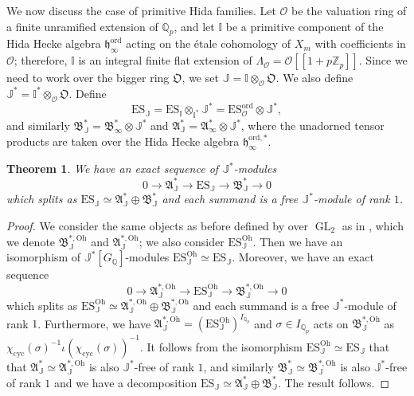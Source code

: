 \documentclass[a4paper,11pt]{amsart}
\numberwithin{equation}{section}
\theoremstyle{plain}
\newtheorem{theorem}{Theorem}[section]
\theoremstyle{definition}
\theoremstyle{remark}
\newcommand{\Q}{\mathbb{Q}}
\newcommand{\Z}{\mathbb{Z}}
\newcommand{\I}{\mathbb{I}}
\newcommand{\J}{\mathbb{J}}
\DeclareMathOperator{\GL}{GL}
\newcommand{\cyc}{{\mathrm{cyc}}}
\newcommand{\ord}{\mathrm{ord}}
\newcommand{\ES}{\mathrm{ES}}
\newcommand{\Oh}{\mathrm{Oh}}
\begin{document}
{We now discuss the case of primitive Hida families. 
Let $\mathcal{O}$ be the valuation ring of a finite unramified extension of $\Q_p$, and let $\mathbb{I}$ be a primitive component of the Hida Hecke algebra $\mathfrak{h}_\infty^\ord$ acting on the \'etale cohomology of $X_m$ with coefficients in $\mathcal{O}$; 
therefore, $\mathbb{I}$ is an integral finite flat extension of $\Lambda_\mathcal{O}=\mathcal{O}[[1+p\Z_p]]$. 
Since we need to work over the bigger ring $\mathfrak{O}$, we set $\mathbb{J}=\mathbb{I}\otimes_{\mathcal{O}}\mathfrak{O}$. 
We also define 
$\mathbb{J}^*=\mathbb{I}^*\otimes_{\mathcal{O}}\mathfrak{O}$. 
Define 
\[\ES_{\J}=\ES_{\I}\otimes_{\I^*}\J^*= \mathrm{ES}_\mathcal{O}^\ord\otimes\J^*,\] 
and similarly $\mathfrak{B}_{\J}^*=\mathfrak{B}_\infty^*\otimes\J^*$ and {$\mathfrak{A}_\J^*=\mathfrak{A}_\infty^*\otimes\J^*$}, where the unadorned tensor products are taken 
over the Hida Hecke algebra $\mathfrak{h}_\infty^{\ord,*}$.

\begin{theorem}
    We have an exact sequence of $\J^*$-modules 
    \[0\longrightarrow \mathfrak{A}_{\J}^{*}\longrightarrow \ES_{\J}\longrightarrow 
\mathfrak{B}_{\J}^{*}\longrightarrow 0\] which splits as 
$\ES_{\J}\simeq \mathfrak{A}_{\J}^{*}\oplus \mathfrak{B}_{\J}^{*}$
and each summand is a free $\J^*$-module of rank $1$. 
\end{theorem}
\begin{proof}
We consider the same objects 
as before defined by over $\GL_2$ as in \cite{Ohta-ES, OhtaMA}, 
which we denote $\mathfrak{B}_{\J}^{*,\Oh}$ and $\mathfrak{A}_{\J}^{*,\Oh}$; we also consider 
$\ES_{\J}^{\Oh}$. Then we have an isomorphism of $\J^*[G_\Q]$-modules 
$\ES_{\J}^{\Oh}\simeq \ES_{\J}$. Moreover, we have an exact sequence 
\[0\longrightarrow \mathfrak{A}_{\J}^{*,\Oh}\longrightarrow \ES_{\J}^{\Oh}\longrightarrow 
\mathfrak{B}_{\J}^{*,\Oh}\longrightarrow 0\] which splits as 
$\ES_{\J}^{\Oh}\simeq \mathfrak{A}_{\J}^{*,\Oh}\oplus \mathfrak{B}_{\J}^{*,\Oh}$
and each summand is a free $\J^*$-module of rank $1$. Furthermore, we have 
$\mathfrak{A}_{\J}^{*, \Oh} = (\ES_{\J}^{\Oh})^{I_{\Q_p}}$ 
and $\sigma\in I_{\Q_p}$ acts on $\mathfrak{B}_{\J}^{*,\Oh}$ as $\chi_\cyc(\sigma)^{-1}\iota(\chi_\cyc(\sigma))^{-1}.$ It follows from the 
isomorphism $\ES_{\J}^{\Oh}\simeq \ES_{\J}$ that 
that 
$\mathfrak{A}_\J^*\simeq \mathfrak{A}_{\J}^{*,\Oh}$ is also $\J^*$-free of rank $1$, 
and similarly $\mathfrak{B}_\J^*\simeq \mathfrak{B}_{\J}^{*,\Oh}$ is also $\J^*$-free of rank $1$ 
and we have a decomposition 
$\ES_{\J}\simeq \mathfrak{A}_{\J}^{*}\oplus \mathfrak{B}_\J^*$. The result follows.\end{proof} 

}
\end{document}
